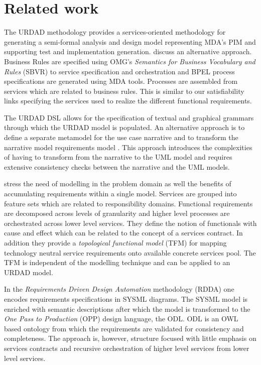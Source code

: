 \section{Related work \label{sec:relatedWork}}

The URDAD methodology provides a services-oriented methodology for generating a semi-formal analysis and design model representing MDA's PIM and supporting test and implementation generation. \cite{iacob_model-driven_2008} discuss an alternative approach. Business Rules are specified using OMG's {\em Semantics for Business Vocabulary and Rules} (SBVR) to service specification and orchestration and BPEL process specifications are generated using MDA tools. Processes are assembled from services which are related to business rules. This is similar to our satisfiability links specifying the services used to realize the different functional requirements.

The URDAD DSL allows for the specification of textual and graphical grammars through which the URDAD model is populated. An alternative approach is to define a separate metamodel for the use case narrative and to transform the narrative model requirements model \cite{hoffmann_towards_2009,osis_transforming_2010}. This approach introduces the complexities of having to transform from the narrative to the UML model and requires extensive consistency checks between the narrative and the UML models.

\cite{asnina_computation_2010} stress the need of modelling in the problem domain as well the benefits of accumulating requirements within a single model. Services are grouped into feature sets which are related to responsibility domains. Functional requirements are decomposed across levels of granularity and higher level processes are orchestrated across lower level services. They define the notion of functionals with cause and effect which can be related to the concept of a services contract. In addition they provide a {\em topological functional model} (TFM) for mapping technology neutral service requirements onto available concrete services pool. The TFM is independent of the modelling technique and can be applied to an URDAD model. 

In the {\em Requirements Driven Design Automation} methodology (RDDA) \cite{cardei_model_2008} one encodes requirements specifications in SYSML diagrams. The SYSML model is enriched with semantic descriptions after which the model is transformed to the {\em One Pass to Production} (OPP) design language, the ODL. ODL is an OWL based ontology from which the requirements are validated for consistency and completeness. The approach is, however, structure focused with little emphasis on services contracts and recursive orchestration of higher level services from lower level services.

